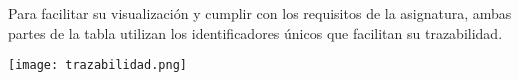 Para facilitar su visualización y cumplir con los requisitos de la asignatura, ambas partes de
la tabla utilizan los identificadores únicos que facilitan su trazabilidad.

\begin{minipage}{\linewidth}
	\centering
	\texttt{[image: trazabilidad.png]}
\end{minipage}
